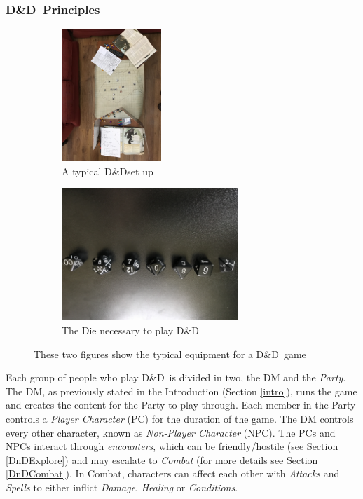 \documentclass[final]{cmpreport}
\newcommand{\dnd}{D\&D}
\begin{document}
	\subsubsection{\dnd \ Principles} \label{DnDPrinciples}
	\begin{figure}[h] \label{DnDEquipmentExample}
		\begin{subfigure}{0.5\textwidth}
			\includegraphics[width=0.9\linewidth, height=5cm, angle=180]{DnD_Live.jpg}
			\caption{A typical \dnd set up} \label{DnDLive}
		\end{subfigure}
		\begin{subfigure}{0.5\textwidth}
			\includegraphics[width=0.9\linewidth, height=5cm, angle=180]{DnD_Dice.jpg}
			\caption{The Die necessary to play \dnd} \label{DnDDice}
		\end{subfigure}
		\caption{These two figures show the typical equipment for a \dnd \ game}
	\end{figure}

	Each group of people who play \dnd \ is divided in two, the DM and the \emph{Party}. The DM, as previously stated in the Introduction (Section \ref{intro}), runs the game and creates the content for the Party to play through. Each member in the Party controls a \emph{Player Character} (PC) for the duration of the game. The DM controls every other character, known as \emph{Non-Player Character} (NPC). The PCs and NPCs interact through \emph{encounters}, which can be friendly/hostile (see Section \ref{DnDExplore}) and may escalate to \emph{Combat} (for more details see Section \ref{DnDCombat}). In Combat, characters can affect each other with \emph{Attacks} and \emph{Spells} to either inflict \emph{Damage}, \emph{Healing} or \emph{Conditions}.
	
\end{document}
